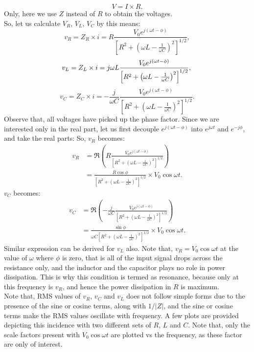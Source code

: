 \documentclass[12pt]{article}
\begin{document}
$$
V=I \times R.
$$
Only, here we use $Z$ instead of $R$ to obtain the voltages. \\
So, let us calculate $V_R$, $V_L$, $V_C$ by this means:
$$
v_R=Z_R \times i=R\frac{V_0 e^{j (\omega t - \phi)}}{\left[R^2+\left(\omega L - \frac{1}{\omega C} \right)^2\right]^{1/2}},
$$
$$
v_L=Z_L \times i=j\omega L\frac{V_0 e^{j (\omega t - \phi)}}{\left[R^2+\left(\omega L - \frac{1}{\omega C} \right)^2\right]^{1/2}}, \\
$$
$$
v_C=Z_C \times i=-\frac{j}{\omega C}\frac{V_0 e^{j (\omega t - \phi)}}{\left[R^2+\left(\omega L - \frac{1}{\omega C} \right)^2\right]^{1/2}}.
$$
Observe that, all voltages have picked up the phase factor. Since we are interested only in the real part, let us first decouple $e^{j(\omega t -\phi)}$ into $e^{j\omega t}$ and $e^{-j\phi}$, and take the real parts:
So, $v_R$ becomes:
$$
\begin{aligned}
v_R &=\Re \left(R\frac{V_0 e^{j (\omega t - \phi)}}{\left[R^2+\left(\omega L - \frac{1}{\omega C} \right)^2\right]^{1/2}}\right) \\
&=\frac{R\cos{\phi}}{{\left[R^2+\left(\omega L - \frac{1}{\omega C} \right)^2\right]^{1/2}}}\times V_0 \cos{\omega t}.
\end{aligned}
$$
$v_C$ becomes:
$$
\begin{aligned}
v_C &=\Re{\left(-\frac{j}{\omega C}\frac{V_0 e^{j (\omega t - \phi)}}{\left[R^2+\left(\omega L - \frac{1}{\omega C} \right)^2\right]^{1/2}}\right)} \\
&=\frac{\sin{\phi}}{\omega C{\left[R^2+\left(\omega L - \frac{1}{\omega C} \right)^2\right]^{1/2}}} \times V_0 \cos{\omega t}.
\end{aligned}
$$
Similar expression can be derived for $v_L$ also.
Note that, $v_R=V_0\cos{\omega t}$ at the value of $\omega$ where $\phi$ is zero, that is all of the input signal drops across the resistance only, and the inductor and the capacitor plays no role in power dissipation. This is why this condition is termed as resonance, because only at this frequency is $v_R$, and hence the power dissipation in $R$ is maximum. \\
Note that, RMS values of $v_R$, $v_C$ and $v_L$ does not follow simple forms due to the presence of the sine or cosine terms, along with $1/|Z|$, and the sine or cosine terms make the RMS values oscillate with frequency. A few plots are provided depicting this incidence with two different sets of $R$, $L$ and $C$. Note that, only the scale factors present with $V_0 \cos{\omega t}$ are plotted vs the frequency, as these factor are only of interest. \\
\end{document}
